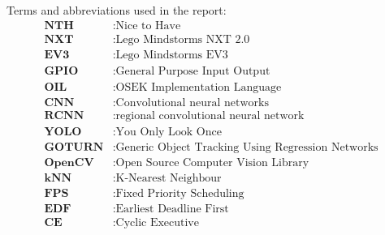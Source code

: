 
Terms and abbreviations used in the report:
\begin{align*}
    \textbf{NTH} &: \text{Nice to Have} \\
    \textbf{NXT} &: \text{Lego Mindstorms NXT 2.0} \\
    \textbf{EV3} &: \text{Lego Mindstorms EV3} \\  
    \textbf{GPIO} &: \text{General Purpose Input Output} \\
    \textbf{OIL} &: \text{OSEK Implementation Language} \\
    \textbf{CNN} &: \text{Convolutional neural networks} \\ 
    \textbf{RCNN} &: \text{regional convolutional neural network} \\ 
    \textbf{YOLO} &: \text{You Only Look Once} \\ 
    \textbf{GOTURN} &: \text{Generic Object Tracking Using Regression Networks} \\
    \textbf{OpenCV} &: \text{Open Source Computer Vision Library} \\
    \textbf{kNN} &: \text{K-Nearest Neighbour} \\
    \textbf{FPS} &: \text{Fixed Priority Scheduling} \\
    \textbf{EDF} &: \text{Earliest Deadline First} \\
    \textbf{CE} &: \text{Cyclic Executive} \\
\end{align*}
